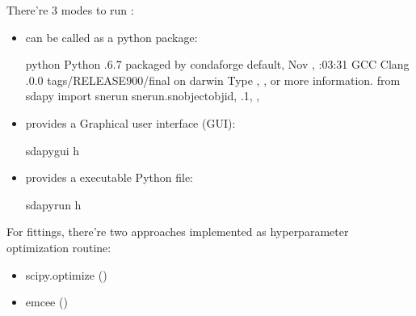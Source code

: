 \documentclass[letterpaper,10pt,english]{sphinxmanual}
\begin{document}
There’re 3 modes to run :
\begin{itemize}
\item {} 
 can be called as a python package:

\begin{sphinxVerbatim}[commandchars=\\\{\}]
\PYGZgt{}\PYGZgt{}\PYGZgt{} python
Python .6.7  packaged by conda\PYGZhy{}forge  default, Nov   , :03:31
\PYG{o}{[}GCC Clang .0.0 tags/RELEASE\PYGZus{}900/final\PYG{o}{]} on darwin
Type , ,  or   more information.
\PYGZgt{}\PYGZgt{}\PYGZgt{} from sdapy import snerun
\PYGZgt{}\PYGZgt{}\PYGZgt{}   snerun.snobjectobjid, .1, , 
\end{sphinxVerbatim}

\item {} 
 provides a Graphical user interface (GUI):

\begin{sphinxVerbatim}[commandchars=\\\{\}]
\PYGZgt{}\PYGZgt{}\PYGZgt{} sdapy\PYGZus{}gui \PYGZhy{}h
\end{sphinxVerbatim}

\item {} 
 provides a executable Python file:

\begin{sphinxVerbatim}[commandchars=\\\{\}]
\PYGZgt{}\PYGZgt{}\PYGZgt{} sdapy\PYGZus{}run \PYGZhy{}h
\end{sphinxVerbatim}

\end{itemize}

For fittings, there’re two approaches implemented as hyperparameter optimization routine:
\begin{itemize}
\item {} 
scipy.optimize ()

\item {} 
emcee ()

\end{itemize}
\end{document}
